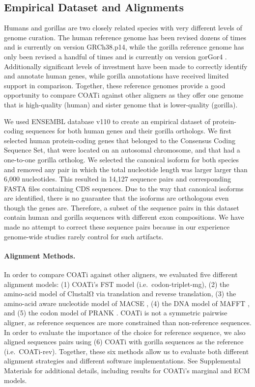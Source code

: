 \documentclass[12pt,letterpaper]{article}
\begin{document}
\subsection*{Empirical Dataset and Alignments}

Humans and gorillas are two closely related species with very different levels of genome curation. The human reference genome has been revised dozens of times and is currently on version GRCh38.p14, while the gorilla reference genome has only been revised a handful of times and is currently on version gorGor4 \citep[cf.\ ENSEMBL database v110;][]{ensembl_hubbard_2002}. Additionally significant levels of investment have been made to correctly identify and annotate human genes, while gorilla annotations have received limited support in comparison. Together, these reference genomes provide a good opportunity to compare COATi against other aligners as they offer one genome that is high-quality (human) and sister genome that is lower-quality (gorilla).

We used ENSEMBL database v110 \citep{ensembl_hubbard_2002} to create an empirical dataset of protein-coding sequences for both human genes and their gorilla orthologs. We first selected human protein-coding genes that belonged to the Consensus Coding Sequence Set, that were located on an autosomal chromosome, and that had a one-to-one gorilla ortholog. We selected the canonical isoform for both species and removed any pair in which the total nucleotide length was larger larger than 6,000 nucleotides. This resulted in 14,127 sequence pairs and corresponding FASTA files containing CDS sequences. Due to the way that canonical isoforms are identified, there is no guarantee that the isoforms are orthologous even though the genes are. Therefore, a subset of the sequence pairs in this dataset contain human and gorilla sequences with different exon compositions. We have made no attempt to correct these sequence pairs because in our experience genome-wide studies rarely control for such artifacts.

\paragraph{Alignment Methods.}

In order to compare COATi against other aligners, we evaluated five different alignment models: (1) COATi's FST model (i.e.\ codon-triplet-mg), (2) the amino-acid model of ClustalΩ \citep{clustal_omega_sievers_2011} via translation and reverse translation, (3) the amino-acid aware nucleotide model of MACSE \citep{ranwez_macse_2018}, (4) the DNA model of MAFFT \citep{katoh2013mafft}, and (5) the codon model of PRANK \citep{prank_loytynoja_2014}. 
COATi is not a symmetric pairwise aligner, as reference sequences are more constrained than non-reference sequences. In order to evaluate the importance of the choice for reference sequence, we also aligned sequences pairs using (6) COATi with gorilla sequences as the reference (i.e.\ COATi-rev). Together, these six methods allow us to evaluate both different alignment strategies and different software implementations. See Supplemental Materials for additional details, including results for COATi's marginal and ECM models.
\end{document}

